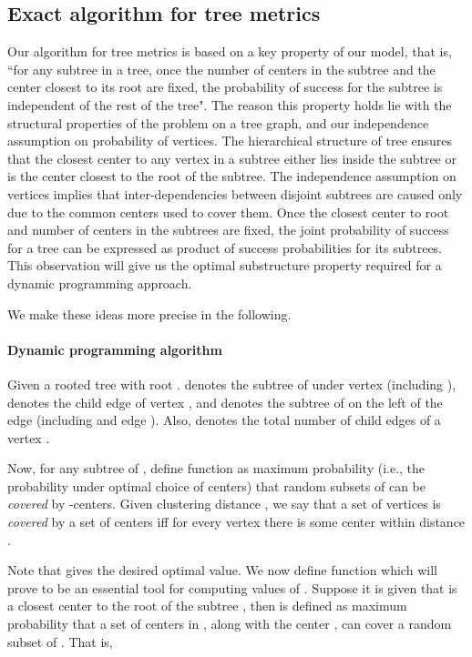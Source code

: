 \documentclass[11pt,onecolumn]{article}
\begin{document}
\subsection{Exact algorithm for tree metrics}
Our algorithm for tree metrics is based on a key property of our model, that is, ``for any subtree in a tree, once the number of centers in the subtree and the center closest to its root are fixed, the probability of success for the subtree is independent of the rest of the tree". The reason this property holds lie with the structural properties of the problem on a tree graph, and our independence assumption on probability of vertices. The hierarchical structure of tree ensures that the closest center to any vertex in a subtree either lies inside the subtree or is the center closest to the root of the subtree. 
The independence assumption on vertices implies that inter-dependencies between disjoint subtrees are caused only due to the common centers used to cover them. Once the closest center to root and number of centers in the subtrees are fixed, the joint probability of success for a tree can be expressed as product of success probabilities for its subtrees.  This observation will give us the optimal substructure property required for a dynamic programming approach.

We make these ideas more precise in the following.
 
\paragraph{Dynamic programming algorithm}
Given a rooted tree  with root .  denotes the subtree of  under vertex  (including ),  denotes the  child edge of vertex , and  denotes the subtree of  on the left of the edge  (including  and edge ). 
Also,  denotes the total number of child edges of a vertex .



Now, for any subtree  of , define function  as maximum probability (i.e., the probability under optimal choice of centers) that random subsets  of  can be {\it covered} by -centers. Given clustering distance , we say that a set of vertices is {\it covered} by a set of centers iff for every vertex there is some center within distance .

Note that  gives the desired optimal value. We now define function  which will prove to be an essential tool for computing values of . Suppose it is given that  is a closest center to the root of the subtree , then  is defined as maximum probability that a set of  centers in , along with the center , can cover a random subset of . That is,
\end{document}
